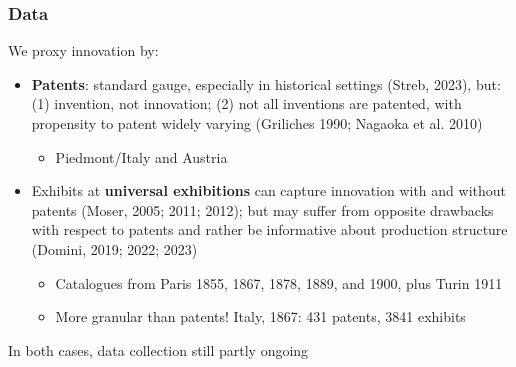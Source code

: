 \documentclass[10pt]{beamer}
\begin{document}
    
\begin{frame}
    \frametitle{Data}
    
    We proxy innovation by:

    \begin{itemize}
        \item \textbf{Patents}: standard gauge, especially in historical settings (Streb, 2023), but: (1) invention, not innovation; (2) not all inventions are patented, with propensity to patent widely varying (Griliches 1990; Nagaoka et al. 2010)
        
        \begin{itemize}
            \item Piedmont/Italy and Austria
        \end{itemize}

        \pause
        
        \item Exhibits at \textbf{universal exhibitions} can capture innovation with and without patents (Moser, 2005; 2011; 2012); but may suffer from opposite drawbacks with respect to patents and rather be informative about production structure (Domini, 2019; 2022; 2023)
         
        \begin{itemize}
            \item Catalogues from Paris 1855, 1867, 1878, 1889, and 1900, plus Turin 1911
            \item More granular than patents! Italy, 1867: 431 patents, 3841 exhibits 
        \end{itemize}

    \end{itemize}

    \bigskip
    In both cases, data collection still partly ongoing
    
\end{frame}
\end{document}
